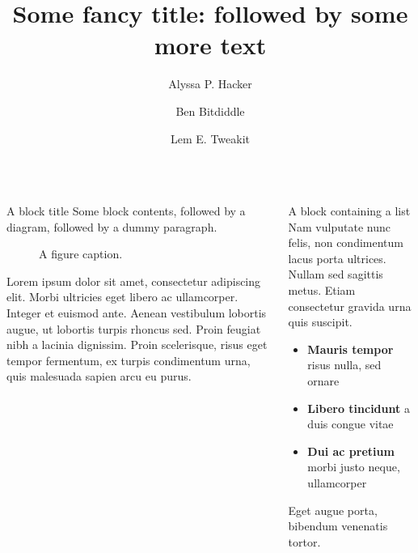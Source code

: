 \documentclass{beamer}
\title{Some fancy title: followed by some more text}
\author{Alyssa P. Hacker \inst{1} \and Ben Bitdiddle \inst{2} \and Lem E. Tweakit \inst{2}}
\institute[shortinst]{\inst{1} Some Institute \samelineand \inst{2} Another Institute}
\begin{document}
\begin{frame}[t]
  \begin{columns}[t]
    \column{0.3\paperwidth}
    \begin{block}{A block title}
      Some block contents, followed by a diagram, followed by a dummy paragraph.
      \begin{figure}
        \centering
        \caption{A figure caption.}
      \end{figure}
      Lorem ipsum dolor sit amet, consectetur adipiscing elit. Morbi ultricies
      eget libero ac ullamcorper. Integer et euismod ante. Aenean vestibulum
      lobortis augue, ut lobortis turpis rhoncus sed. Proin feugiat nibh a
      lacinia dignissim. Proin scelerisque, risus eget tempor fermentum, ex
      turpis condimentum urna, quis malesuada sapien arcu eu purus.
    \end{block}

    \begin{alertblock}{A block containing a list}
      Nam vulputate nunc felis, non condimentum lacus porta ultrices. Nullam sed sagittis metus. Etiam consectetur gravida urna quis suscipit.
      \begin{itemize}
        \item \textbf{Mauris tempor} risus nulla, sed ornare
        \item \textbf{Libero tincidunt} a duis congue vitae
        \item \textbf{Dui ac pretium} morbi justo neque, ullamcorper
      \end{itemize}
      Eget augue porta, bibendum venenatis tortor.
    \end{alertblock}


\end{columns}
\end{frame}
\end{document}

